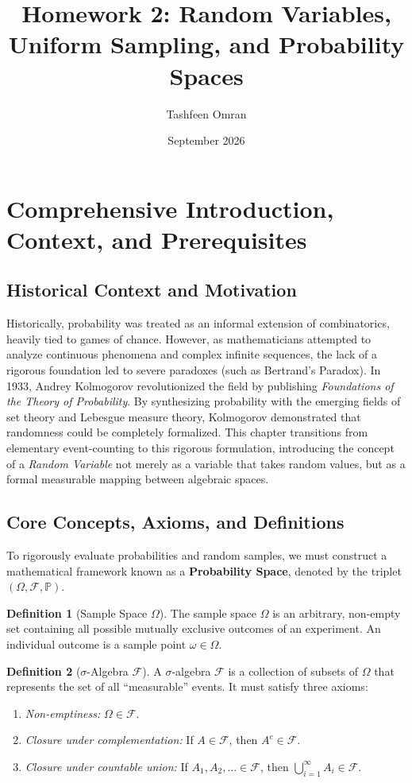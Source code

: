 \documentclass[11pt]{article}
\title{\textbf{Homework 2: Random Variables, Uniform Sampling, and Probability Spaces}}
\author{Tashfeen Omran}
\date{September 2026}
\theoremstyle{definition}
\newtheorem{definition}{Definition}[section]
\theoremstyle{plain}
\theoremstyle{remark}
\newcommand{\F}{\mathcal{F}}
\renewcommand{\P}{\mathbb{P}}
\newcommand{\1}{\mathbf{1}}
\begin{document}
\maketitle
\tableofcontents
\newpage

\section{Comprehensive Introduction, Context, and Prerequisites}

\subsection{Historical Context and Motivation}
Historically, probability was treated as an informal extension of combinatorics, heavily tied to games of chance. However, as mathematicians attempted to analyze continuous phenomena and complex infinite sequences, the lack of a rigorous foundation led to severe paradoxes (such as Bertrand's Paradox). In 1933, Andrey Kolmogorov revolutionized the field by publishing \textit{Foundations of the Theory of Probability}. By synthesizing probability with the emerging fields of set theory and Lebesgue measure theory, Kolmogorov demonstrated that randomness could be completely formalized. This chapter transitions from elementary event-counting to this rigorous formulation, introducing the concept of a \textit{Random Variable} not merely as a variable that takes random values, but as a formal measurable mapping between algebraic spaces.

\subsection{Core Concepts, Axioms, and Definitions}
To rigorously evaluate probabilities and random samples, we must construct a mathematical framework known as a \textbf{Probability Space}, denoted by the triplet $(\Omega, \F, \P)$.

\begin{definition}[Sample Space $\Omega$]
The sample space $\Omega$ is an arbitrary, non-empty set containing all possible mutually exclusive outcomes of an experiment. An individual outcome is a sample point $\omega \in \Omega$.
\end{definition}

\begin{definition}[$\sigma$-Algebra $\F$]
A $\sigma$-algebra $\F$ is a collection of subsets of $\Omega$ that represents the set of all ``measurable'' events. It must satisfy three axioms:
\begin{enumerate}
    \item \textit{Non-emptiness:} $\Omega \in \F$.
    \item \textit{Closure under complementation:} If $A \in \F$, then $A^c \in \F$.
    \item \textit{Closure under countable union:} If $A_1, A_2, \dots \in \F$, then $\bigcup_{i=1}^\infty A_i \in \F$.
\end{enumerate}
\end{definition}
\end{document}
